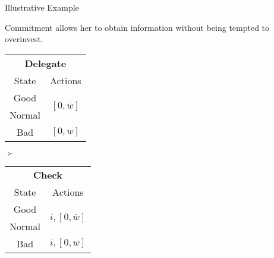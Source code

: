 \documentclass[usenames,dvipsnames,aspectratio=169,11pt, envcountsect, handout]{beamer}
\begin{document}
\begin{frame}[noframenumbering]{Illustrative Example}

	Commitment allows her to obtain information without being tempted to overinvest.

	\vfill

	\begin{table}[H]
		\centering
		\begin{minipage}{0.29\textwidth}
			\centering
			\begin{tabular}{c | c}
				\multicolumn{2}{c}{\textbf{Delegate}}                                                     \\
				State                & Actions                                                            \\
				\hline
				{\color{blue}Good}   & \multirow{2}{*}{{\color{blue}\( \left[0, \overline{w} \right] \)}} \\
				{\color{blue}Normal} &                                                                    \\
				Bad                  & \( \left[0, w \right]\)                                            \\
			\end{tabular}
			\vspace{0.5cm} %
		\end{minipage}\hspace{0.3cm} %
		\( \succ \) %
		\begin{minipage}{0.29\textwidth}
			\centering
			\begin{tabular}{c | c}
				\multicolumn{2}{c}{\textbf{Check}}                                                            \\
				State                & Actions                                                                \\
				\hline
				{\color{blue}Good}   & \multirow{2}{*}{{\color{blue}\( i, \left[ 0, \overline{w} \right] \)}} \\
				{\color{blue}Normal} &                                                                        \\
				Bad                  & \(  i, \left[0, w \right] \)                                           \\
			\end{tabular}
			\vspace{0.5cm} %

\end{minipage}
\end{table}
\end{frame}
\end{document}
